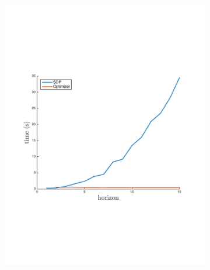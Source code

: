 \begin{figure}[h!]
    \centering
    \begin{subfigure}[b]{0.23\textwidth}    
        \includegraphics[width=\linewidth]{images/time_plot_new}
        \label{fig:time_complexity}        
    \end{subfigure}    
    \begin{subfigure}[b]{0.23\textwidth}    

\end{subfigure}
\end{figure}
